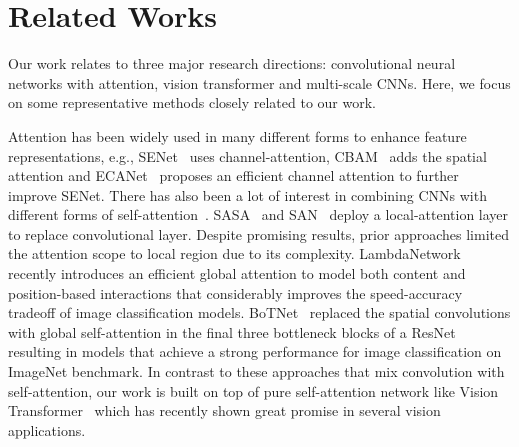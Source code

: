 \documentclass[10pt,twocolumn,letterpaper]{article}
\newcommand{\myparagraphfirst}[1]{\vspace{0mm} \noindent {\textbf{#1}}}
\begin{document}
     \section{Related Works}
\label{sec:related_works}

Our work relates to three major research directions: convolutional neural networks with attention, vision transformer and multi-scale CNNs. Here, we focus on some representative methods closely related to our work.

\vspace{0.5mm}
\myparagraphfirst{CNN with Attention.} Attention has been widely used in many different forms to enhance feature representations, e.g., SENet~\cite{SENet_Hu_2018} uses channel-attention, CBAM~\cite{CBAM_Woo_2018_ECCV} adds the spatial attention and ECANet~\cite{ECA_wang2020} proposes an efficient channel attention to further improve SENet. There has also been a lot of interest in combining CNNs with different forms of self-attention~\cite{lambdanetworks_bello2021,BoT_srinivas2021,SAN_Zhao_2020_CVPR,SASA_Ramachandran_2019_NeurIPS,bello2019attention,hu2019local,ramachandran2019stand,wang2018non}. SASA~\cite{SASA_Ramachandran_2019_NeurIPS} and SAN~\cite{SAN_Zhao_2020_CVPR} deploy a local-attention layer to replace convolutional layer. Despite promising results, prior approaches limited the attention scope to local region due to its complexity. LambdaNetwork~\cite{lambdanetworks_bello2021} recently introduces an efficient global attention to model both content and position-based interactions that considerably improves the speed-accuracy tradeoff of image classification models.
BoTNet~\cite{BoT_srinivas2021} replaced the spatial convolutions with global self-attention in the final three bottleneck blocks of a ResNet resulting in models that achieve a strong performance for image classification on ImageNet benchmark.
In contrast to these approaches that mix convolution with self-attention, our work is built on top of pure self-attention network like Vision Transformer~\cite{ViT_dosovitskiy2021an} which has recently shown great promise in several vision applications. 
\end{document}
